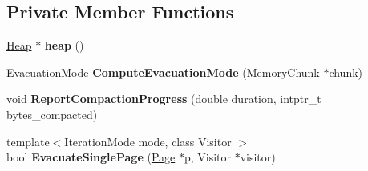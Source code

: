 \subsection*{Private Member Functions}
\begin{DoxyCompactItemize}
\item 
\hyperlink{classv8_1_1internal_1_1_heap}{Heap} $\ast$ {\bfseries heap} ()\hypertarget{classv8_1_1internal_1_1_mark_compact_collector_1_1_evacuator_a4d6d1dcdb640395d8dab534408f7b386}{}\label{classv8_1_1internal_1_1_mark_compact_collector_1_1_evacuator_a4d6d1dcdb640395d8dab534408f7b386}

\item 
Evacuation\+Mode {\bfseries Compute\+Evacuation\+Mode} (\hyperlink{classv8_1_1internal_1_1_memory_chunk}{Memory\+Chunk} $\ast$chunk)\hypertarget{classv8_1_1internal_1_1_mark_compact_collector_1_1_evacuator_a912c0c007b710bdb88b15a656bd43d13}{}\label{classv8_1_1internal_1_1_mark_compact_collector_1_1_evacuator_a912c0c007b710bdb88b15a656bd43d13}

\item 
void {\bfseries Report\+Compaction\+Progress} (double duration, intptr\+\_\+t bytes\+\_\+compacted)\hypertarget{classv8_1_1internal_1_1_mark_compact_collector_1_1_evacuator_a7350752b0dd08a2f84793d93a003cd02}{}\label{classv8_1_1internal_1_1_mark_compact_collector_1_1_evacuator_a7350752b0dd08a2f84793d93a003cd02}

\item 
{\footnotesize template$<$Iteration\+Mode mode, class Visitor $>$ }\\bool {\bfseries Evacuate\+Single\+Page} (\hyperlink{classv8_1_1internal_1_1_page}{Page} $\ast$p, Visitor $\ast$visitor)\hypertarget{classv8_1_1internal_1_1_mark_compact_collector_1_1_evacuator_a97139e191dfc5927a89a5caf73f412c5}{}\label{classv8_1_1internal_1_1_mark_compact_collector_1_1_evacuator_a97139e191dfc5927a89a5caf73f412c5}

\end{DoxyCompactItemize}
